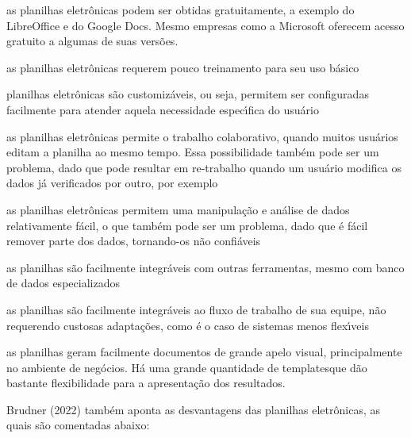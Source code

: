 \documentclass[
12pt,		%
openright,	%
twoside,  %
a4paper,			%
chapter=TITLE,		%
english,			%
french,				%
spanish,			%
brazil				%
]{USPSC-classe/USPSC}
\begin{document}
\begin{alineas}
\item as planilhas eletr\^onicas podem ser obtidas gratuitamente, a exemplo do LibreOffice e do Google Docs. Mesmo empresas como a Microsoft oferecem acesso gratuito a algumas de suas vers\~oes.
\item as planilhas eletr\^onicas requerem pouco treinamento para seu uso b\'asico
\item planilhas eletr\^onicas s\~ao \textquotedbl customiz\'aveis\textquotedbl , ou seja, permitem ser configuradas facilmente para atender aquela necessidade espec\'{\i}fica do usu\'ario
\item as planilhas eletr\^onicas permite o trabalho colaborativo, quando muitos usu\'arios editam a planilha ao mesmo tempo. Essa possibilidade tamb\'em pode ser um problema, dado que pode resultar em re-trabalho quando um usu\'ario modifica os dados j\'a verificados por outro, por exemplo
\item as planilhas eletr\^onicas permitem uma manipula\c{c}\~ao e an\'alise de dados relativamente f\'acil, o que tamb\'em pode ser um problema, dado que \'e f\'acil remover parte dos dados, tornando-os n\~ao confi\'aveis
\item as planilhas s\~ao facilmente integr\'aveis com outras  ferramentas, mesmo com banco de dados especializados
\item as planilhas s\~ao facilmente integr\'aveis ao fluxo de trabalho de sua equipe, n\~ao requerendo custosas adapta\c{c}\~oes, como \'e o caso de sistemas menos flex\'{\i}veis
\item as planilhas geram facilmente documentos de grande apelo visual, principalmente no ambiente de neg\'ocios. H\'a uma grande quantidade de \textquotedbl templates\textquotedbl  que d\~ao bastante flexibilidade para a apresenta\c{c}\~ao dos resultados.
\end{alineas}

 Brudner (2022) tamb\'em aponta as desvantagens das planilhas eletr\^onicas, as quais s\~ao comentadas abaixo:
\end{document}
